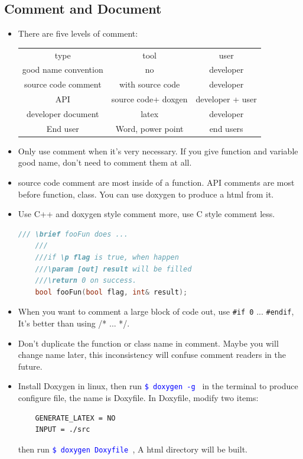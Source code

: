 \documentclass[a4paper,11pt,twoside]{book}
\newcommand{\linuxcommand}[1]{\texttt{\textcolor{blue}{\$ #1 \Pisymbol{psy}{191}}}}
\renewcommand{\hline}{}
\begin{document}
\subsection{Comment and Document}

\begin{itemize}
	\item There are five levels of comment: \\
	\begin{tabular}{|c|c|c|}
		\hline 
		type & tool & user \\ 
		\hline 
		good name convention & no & developer  \\ 
		\hline 
		source code comment & with source code &  developer \\ 
		\hline 
		API & source code+ doxgen  & developer + user  \\ 
		\hline 
		developer document & latex &  developer \\ 
		\hline 
		End user & Word, power point & end users  \\ 
		\hline 
	\end{tabular} 
	
	\item Only use comment when it's very necessary. If you give function and variable good name, don't need to comment them at all. 
	
	\item source code comment are most inside of a function. API comments are most before function, class. You can use doxygen to produce a html from it. 
	
	\item Use C++ and doxygen style comment more, use C style comment less.
	
	\begin{lstlisting}[frame=single, language=c++]
	/// \brief fooFun does ...
	///
	///if \p flag is true, when happen
	///\param [out] result will be filled
	///\return 0 on success.
	bool fooFun(bool flag, int& result);
	\end{lstlisting}
	
	\item When you want to comment a large block of code out, use \texttt{\#if 0} ...  \texttt{\#endif}, It's better than using /* ... */. 
	
	\item Don't duplicate the function or class name in comment. Maybe you will change name later, this inconsistency will confuse comment readers in the future.
	
	\item Install Doxygen in linux, then run \linuxcommand{doxygen -g} in the terminal to produce configure file, the name is Doxyfile.  In Doxyfile, modify two items:
	\begin{verbatim}
	GENERATE_LATEX = NO
	INPUT = ./src
	\end{verbatim}
	then run \linuxcommand{doxygen Doxyfile}, A html directory will be built.
	

\end{itemize}
\end{document}
